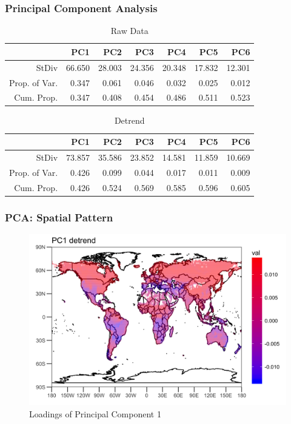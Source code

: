 \documentclass{beamer}
\begin{document}
\begin{frame}
\frametitle{Principal Component Analysis}
\begin{table}[ht]
\centering
\begin{tabular}{rrrrrrr}
\hline
& PC1 & PC2 & PC3 & PC4 & PC5 & PC6 \\ 
\hline
StDiv & 66.650 & 28.003 & 24.356 & 20.348 & 17.832 & 12.301 \\ 
Prop. of Var. & 0.347 & 0.061 & 0.046 & 0.032 & 0.025 & 0.012 \\ 
Cum. Prop.& 0.347 & 0.408 & 0.454 & 0.486 & 0.511 & 0.523 \\ 
\hline
\end{tabular}
\caption{Raw Data}
\end{table}
\begin{table}[ht]
\centering
\begin{tabular}{rrrrrrr}
\hline
& PC1 & PC2 & PC3 & PC4 & PC5 & PC6 \\ 
\hline
StDiv & 73.857 & 35.586 & 23.852 & 14.581 & 11.859 & 10.669 \\ 
Prop. of Var. & 0.426 & 0.099 & 0.044 & 0.017 & 0.011 & 0.009 \\ 
Cum. Prop. & 0.426 & 0.524 & 0.569 & 0.585 & 0.596 & 0.605 \\ 
\hline
\end{tabular}
\caption{Detrend}
\end{table}
\end{frame}



\begin{frame}
\frametitle{PCA: Spatial Pattern}
\begin{figure}
\centering
\includegraphics[width=0.9\linewidth]{../img/loading_PC1_de}
\caption{Loadings of Principal Component 1}
\label{fig:loadingpc1}
\end{figure}
\end{frame}
\end{document}
